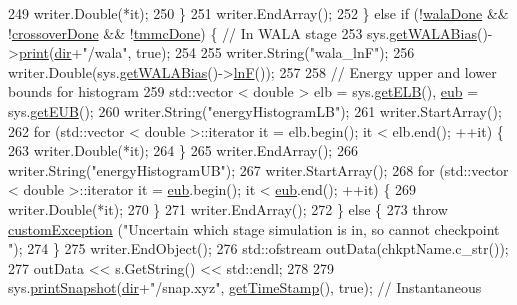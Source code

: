 \begin{DoxyCode}
249             writer.Double(*it);
250         \}
251         writer.EndArray();
252     \} \textcolor{keywordflow}{else} \textcolor{keywordflow}{if} (!\hyperlink{classcheckpoint_aab066479e2ca6656d0031dd46a2fc1a5}{walaDone} && !\hyperlink{classcheckpoint_a4f13612ea6d376bb327295bfce3a70c5}{crossoverDone} && !\hyperlink{classcheckpoint_acbe0c62aa82735741a9f396827966823}{tmmcDone}) \{ \textcolor{comment}{// In WALA stage}
253         sys.\hyperlink{classsim_system_a7cb5049de8b0988349e89e30e4000407}{getWALABias}()->\hyperlink{classwala_a65569289fac85d0da9c336e17c9d809a}{print}(\hyperlink{classcheckpoint_a0e0f999ee8e0b09541e9131baa8a591d}{dir}+\textcolor{stringliteral}{"/wala"}, \textcolor{keyword}{true});
254 
255         writer.String(\textcolor{stringliteral}{"wala\_lnF"});
256         writer.Double(sys.\hyperlink{classsim_system_a7cb5049de8b0988349e89e30e4000407}{getWALABias}()->\hyperlink{classwala_acb8e59580d97bc3c5b9b4ff45eb6bb9a}{lnF}());
257 
258         \textcolor{comment}{// Energy upper and lower bounds for histogram}
259         std::vector < double > elb = sys.\hyperlink{classsim_system_a610cbb1c6059151e420dbd42dd9da714}{getELB}(), \hyperlink{classcheckpoint_a7071b01d0936873321d0a706e761b6ac}{eub} = sys.\hyperlink{classsim_system_ae87e0ac03cc11259cd3b44c780a90a06}{getEUB}();
260         writer.String(\textcolor{stringliteral}{"energyHistogramLB"});
261         writer.StartArray();
262         \textcolor{keywordflow}{for} (std::vector < double >::iterator it = elb.begin(); it < elb.end(); ++it) \{
263             writer.Double(*it);
264         \}
265         writer.EndArray();
266         writer.String(\textcolor{stringliteral}{"energyHistogramUB"});
267         writer.StartArray();
268         \textcolor{keywordflow}{for} (std::vector < double >::iterator it = \hyperlink{classcheckpoint_a7071b01d0936873321d0a706e761b6ac}{eub}.begin(); it < \hyperlink{classcheckpoint_a7071b01d0936873321d0a706e761b6ac}{eub}.end(); ++it) \{
269             writer.Double(*it);
270         \}
271         writer.EndArray();
272     \} \textcolor{keywordflow}{else} \{
273         \textcolor{keywordflow}{throw} \hyperlink{classcustom_exception}{customException} (\textcolor{stringliteral}{"Uncertain which stage simulation is in, so cannot checkpoint
      "});
274     \}
275     writer.EndObject();
276     std::ofstream outData(chkptName.c\_str());
277     outData << s.GetString() << std::endl;
278 
279     sys.\hyperlink{classsim_system_ae3096dc65acdf38cc824e507cca33370}{printSnapshot}(\hyperlink{classcheckpoint_a0e0f999ee8e0b09541e9131baa8a591d}{dir}+\textcolor{stringliteral}{"/snap.xyz"}, \hyperlink{utilities_8cpp_aa6d910bf51f18a75deb20c6f0fbba285}{getTimeStamp}(), \textcolor{keyword}{true}); \textcolor{comment}{// Instantaneous
}
\end{DoxyCode}
